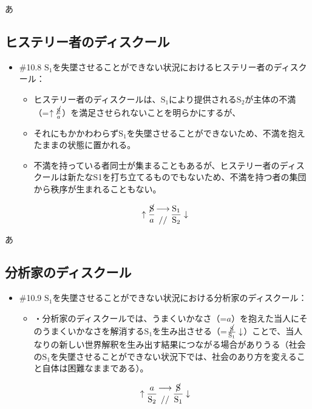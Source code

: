 あ

\subsection{ヒステリー者のディスクール}\label{ux30d2ux30b9ux30c6ux30eaux30fcux8005ux306eux30c7ux30a3ux30b9ux30afux30fcux30eb}

\begin{note}{}
  \begin{itemize}
    \tightlist
    \item{\#10.8} $\textrm{S}_1$を失墜させることができない状況におけるヒステリー者のディスクール：
      \begin{itemize}
        \tightlist
        \item ヒステリー者のディスクールは、$\textrm{S}_1$により提供される$\textrm{S}_2$が主体の不満（=$\uparrow\frac{\cancel{\textrm{S}}}{a}$）を満足させられないことを明らかにするが、
        \item それにもかかわわらず$\textrm{S}_1$を失墜させることができないため、不満を抱えたままの状態に置かれる。
        \item 不満を持っている者同士が集まることもあるが、ヒステリー者のディスクールは新たなS1を打ち立てるものでもないため、不満を持つ者の集団から秩序が生まれることもない。
      \end{itemize}

$$
\uparrow\frac{\cancel{\textrm{S}}}{a}\genfrac{}{}{0pt}{}{\longrightarrow}{//}\frac{\mathrm{S_1}}{\mathrm{S_2}}\downarrow
$$
  \end{itemize}
\end{note}

あ

\subsection{分析家のディスクール}\label{ux5206ux6790ux5bb6ux306eux30c7ux30a3ux30b9ux30afux30fcux30eb}

\begin{note}{}
  \begin{itemize}
    \tightlist
    \item{\#10.9} $\textrm{S}_1$を失墜させることができない状況における分析家のディスクール：
      \begin{itemize}
        \tightlist
        \item ・分析家のディスクールでは、うまくいかなさ（=$a$）を抱えた当人にそのうまくいかなさを解消する$\textrm{S}_1$を生み出させる（=$\frac{\cancel{\textrm{S}}}{\textrm{S}_1}\downarrow$）ことで、当人なりの新しい世界解釈を生み出す結果につながる場合がありうる（社会の$\textrm{S}_1$を失墜させることができない状況下では、社会のあり方を変えること自体は困難なままである）。
      \end{itemize}

$$
\uparrow\frac{a}{\mathrm{S_2}}\genfrac{}{}{0pt}{}{\longrightarrow}{//}\frac{\cancel{\textrm{S}}}{\mathrm{S_1}}\downarrow
$$
  \end{itemize}
\end{note}

